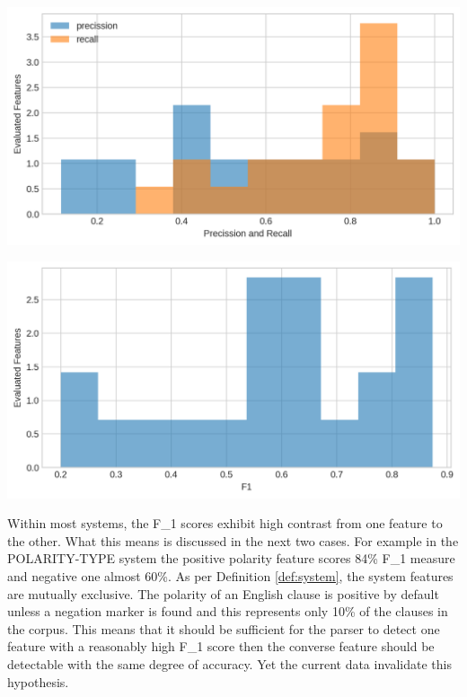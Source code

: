     \noindent
    \begin{minipage}[t]{0.475\textwidth}
        \centering
        \includegraphics[width=\textwidth]{evaluation-results/figures/accuracy-syntactic-mood-precission-recall.png}
        \label{fig:mood-precission-recall}
    \end{minipage}
    \quad
    \begin{minipage}[t]{0.475\textwidth}
        \centering
        \includegraphics[width=\textwidth]{evaluation-results/figures/accuracy-syntactic-mood-f1.png}
        \label{fig:mood-precission-f1}
    \end{minipage}
    \vspace{1em}

    Within most systems, the F_1 scores exhibit high contrast from one feature to the other. What this means is discussed in the next two cases. For example in the POLARITY-TYPE system the positive polarity feature scores 84\% F_1 measure and negative one almost 60\%. As per Definition \ref{def:system}, the system features are mutually exclusive. The polarity of an English clause is positive by default unless a negation marker is found and this represents only 10\% of the clauses in  the corpus. This means that it should be sufficient for the parser to detect one feature with a reasonably high F_1 score then the converse feature should be detectable with the same degree of accuracy. Yet the current data invalidate this hypothesis. 

